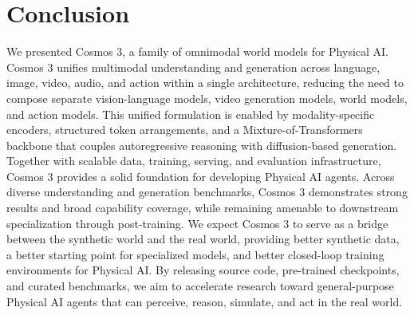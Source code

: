 \section{Conclusion}
\label{sec::conclusion}

We presented Cosmos 3, a family of omnimodal world models for Physical AI. Cosmos 3 unifies multimodal understanding and generation across language, image, video, audio, and action within a single architecture, reducing the need to compose separate vision-language models, video generation models, world models, and action models. This unified formulation is enabled by modality-specific encoders, structured token arrangements, and a Mixture-of-Transformers backbone that couples autoregressive reasoning with diffusion-based generation. Together with scalable data, training, serving, and evaluation infrastructure, Cosmos 3 provides a solid foundation for developing Physical AI agents. Across diverse understanding and generation benchmarks, Cosmos 3 demonstrates strong results and broad capability coverage, while remaining amenable to downstream specialization through post-training. We expect Cosmos 3 to serve as a bridge between the synthetic world and the real world, providing better synthetic data, a better starting point for specialized models, and better closed-loop training environments for Physical AI. By releasing source code, pre-trained checkpoints, and curated benchmarks, we aim to accelerate research toward general-purpose Physical AI agents that can perceive, reason, simulate, and act in the real world.
